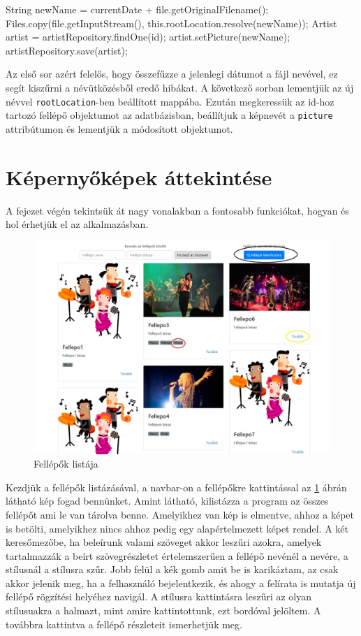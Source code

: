 \begin{java}
String newName =  currentDate + file.getOriginalFilename();
Files.copy(file.getInputStream(),
this.rootLocation.resolve(newName));
Artist artist = artistRepository.findOne(id);
artist.setPicture(newName);
artistRepository.save(artist);
\end{java}
Az első sor azért felelős, hogy összefűzze a jelenlegi dátumot  a fájl nevével, ez segít kiszűrni a névütközésből eredő hibákat. A következő sorban lementjük az új névvel \texttt{rootLocation}-ben beállított mappába. Ezután megkeressük az id-hoz tartozó fellépő objektumot az adatbázisban, beállítjuk a képnevét a \texttt{picture} attribútumon és lementjük a módosított objektumot.

\section{Képernyőképek áttekintése}
A fejezet végén tekintsük át nagy vonalakban a fontosabb funkciókat, hogyan és hol érhetjük el az alkalmazásban. 
\begin{figure}
\centering
\includegraphics[scale=0.45]{kepek/artistList.jpg}
\caption{Fellépők listája}
\label{fig:artistList}
\end{figure}

Kezdjük a fellépők listázásával, a navbar-on a fellépőkre kattintással az \ref{fig:artistList} ábrán látható kép fogad bennünket. Amint látható, kilistázza a program az összes fellépőt ami le van tárolva benne. Amelyikhez van kép is elmentve, ahhoz a képet is betölti, amelyikhez nincs ahhoz pedig egy alapértelmezett képet rendel. A  két keresőmezőbe, ha beleírunk valami szöveget akkor leszűri azokra, amelyek tartalmazzák a beírt szövegrészletet értelemszerűen a fellépő nevénél a nevére, a stílusnál a stílusra szűr. Jobb felül a kék gomb amit be is karikáztam, az csak akkor jelenik meg, ha a felhasználó bejelentkezik, és ahogy a felírata is mutatja új fellépő  rögzítési helyéhez navigál. A stílusra kattintásra leszűri az olyan stílusuakra a halmazt, mint amire kattintottunk, ezt bordóval jelöltem. A továbbra kattintva a  fellépő részleteit ismerhetjük meg.

